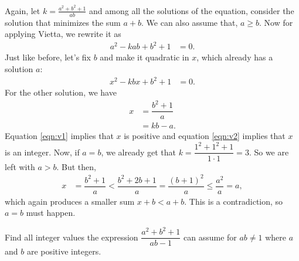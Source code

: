 \documentclass{subfile}
\begin{document}
	\begin{solution}
		Again, let $k=\frac{a^2+b^2+1}{ab}$ and among all the solutions of the equation, consider the solution that minimizes the sum $a+b$. We can also assume that, $a\geq b$. Now for applying Vietta, we rewrite it as
			\begin{align*}
				a^2-kab+b^2+1 & = 0.
			\end{align*}
		Just like before, let's fix $b$ and make it quadratic in $x$, which already has a solution $a$:
			\begin{align*}
				x^2-kbx+b^2+1 & = 0.
			\end{align*}
		For the other solution, we have
			\begin{align}
				x & = \dfrac{b^2+1}{a}\label{eqn:v1}\\
				  & = kb-a.\label{eqn:v2}
			\end{align}
		Equation \eqref{eqn:v1} implies that $x$ is positive and equation \eqref{eqn:v2} implies that $x$ is an integer. Now, if $a=b$, we already get that $k=\dfrac{1^2+1^2+1}{1\cdot1}=3$. So we are left with $a>b$. But then,
			\begin{align*}
				x & = \dfrac{b^2+1}{a}< \dfrac{b^2+2b+1}{a}= \dfrac{(b+1)^2}{a} \leq\dfrac{a^2}{a} = a,
			\end{align*}
		which again produces a smaller sum $x+b<a+b$. This is a contradiction, so $a=b$ must happen.
	\end{solution}
	
	\begin{problem}
		Find all integer values the expression $\dfrac{a^2+b^2+1}{ab-1}$ can assume for $ab\neq1$ where $a$ and $b$ are positive integers.
	\end{problem}
	
\end{document}
